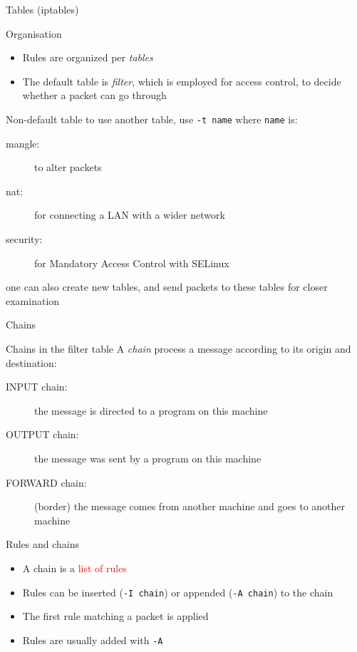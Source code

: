 \begin{reveals}
\begin{frame}[c]{Tables (iptables)}

  \begin{block}{Organisation}
    \begin{itemize}
    \item Rules are organized per \emph{tables}
    \item The default table is \emph{filter}, which is employed for
      access control, to decide whether a packet can go through
    \end{itemize}
  \end{block}

  \vfill

  \begin{block}{Non-default table}
    to use another table, use \texttt{-t name} where \texttt{name} is:
    \begin{description}
    \item[mangle:] to alter packets
    \item[nat:] for connecting a LAN with a wider network
    \item[security:] for Mandatory Access Control with SELinux
    \end{description}
    one can also create new tables, and send packets to these tables
    for closer examination
  \end{block}

\end{frame}


\begin{frame}[c]{Chains}

  \begin{block}{Chains in the filter table}
    A \emph{chain} process a message according to its origin and
    destination:
    \begin{description}
    \item[INPUT chain:] the message is directed to a program on this machine
    \item[OUTPUT chain:] the message was sent by a program on this machine
    \item[FORWARD chain:] (border) the message comes from another
      machine and goes to another machine
    \end{description}
  \end{block}

  \begin{block}{Rules and chains}
    \begin{itemize}
    \item A chain is a \textcolor{red}{list of rules}
    \item Rules can be inserted (\texttt{-I chain}) or appended
      (\texttt{-A chain}) to the chain
    \item The first rule matching a packet is applied
    \item Rules are usually added with \texttt{-A}
    \end{itemize}
  \end{block}


\end{frame}
\end{reveals}

